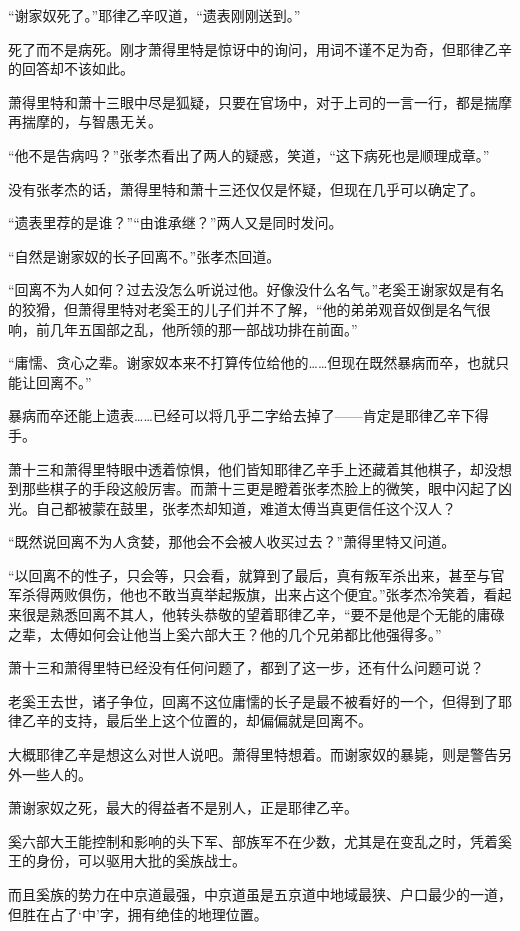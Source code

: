 “谢家奴死了。”耶律乙辛叹道，“遗表刚刚送到。”

死了而不是病死。刚才萧得里特是惊讶中的询问，用词不谨不足为奇，但耶律乙辛的回答却不该如此。

萧得里特和萧十三眼中尽是狐疑，只要在官场中，对于上司的一言一行，都是揣摩再揣摩的，与智愚无关。

“他不是告病吗？”张孝杰看出了两人的疑惑，笑道，“这下病死也是顺理成章。”

没有张孝杰的话，萧得里特和萧十三还仅仅是怀疑，但现在几乎可以确定了。

“遗表里荐的是谁？”“由谁承继？”两人又是同时发问。

“自然是谢家奴的长子回离不。”张孝杰回道。

“回离不为人如何？过去没怎么听说过他。好像没什么名气。”老奚王谢家奴是有名的狡猾，但萧得里特对老奚王的儿子们并不了解，“他的弟弟观音奴倒是名气很响，前几年五国部之乱，他所领的那一部战功排在前面。”

“庸懦、贪心之辈。谢家奴本来不打算传位给他的……但现在既然暴病而卒，也就只能让回离不。”

暴病而卒还能上遗表……已经可以将几乎二字给去掉了——肯定是耶律乙辛下得手。

萧十三和萧得里特眼中透着惊惧，他们皆知耶律乙辛手上还藏着其他棋子，却没想到那些棋子的手段这般厉害。而萧十三更是瞪着张孝杰脸上的微笑，眼中闪起了凶光。自己都被蒙在鼓里，张孝杰却知道，难道太傅当真更信任这个汉人？

“既然说回离不为人贪婪，那他会不会被人收买过去？”萧得里特又问道。

“以回离不的性子，只会等，只会看，就算到了最后，真有叛军杀出来，甚至与官军杀得两败俱伤，他也不敢当真举起叛旗，出来占这个便宜。”张孝杰冷笑着，看起来很是熟悉回离不其人，他转头恭敬的望着耶律乙辛，“要不是他是个无能的庸碌之辈，太傅如何会让他当上奚六部大王？他的几个兄弟都比他强得多。”

萧十三和萧得里特已经没有任何问题了，都到了这一步，还有什么问题可说？

老奚王去世，诸子争位，回离不这位庸懦的长子是最不被看好的一个，但得到了耶律乙辛的支持，最后坐上这个位置的，却偏偏就是回离不。

大概耶律乙辛是想这么对世人说吧。萧得里特想着。而谢家奴的暴毙，则是警告另外一些人的。

萧谢家奴之死，最大的得益者不是别人，正是耶律乙辛。

奚六部大王能控制和影响的头下军、部族军不在少数，尤其是在变乱之时，凭着奚王的身份，可以驱用大批的奚族战士。

而且奚族的势力在中京道最强，中京道虽是五京道中地域最狭、户口最少的一道，但胜在占了‘中’字，拥有绝佳的地理位置。


